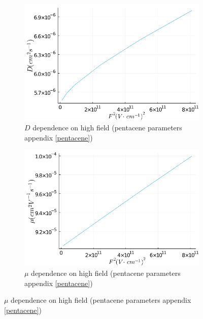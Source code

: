\begin{figure}[htbp]
    \centering
    \begin{subfigure}[t]{0.49\textwidth}
        \centering
        \includegraphics*[width=\textwidth]{figures/3_elec/d_field_high_square.png}
        \caption{$D$ dependence on high field (pentacene parameters appendix \ref{pentacene})\label{fig:3_16}}
    \end{subfigure}
    \begin{subfigure}[t]{0.49\textwidth}
        \centering
        \includegraphics*[width=\textwidth]{figures/3_elec/mobi_field_high_square.png}
        \caption{$\mu$ dependence on high field (pentacene parameters appendix \ref{pentacene})\label{fig:3_17}}
    \end{subfigure}
\end{figure}

